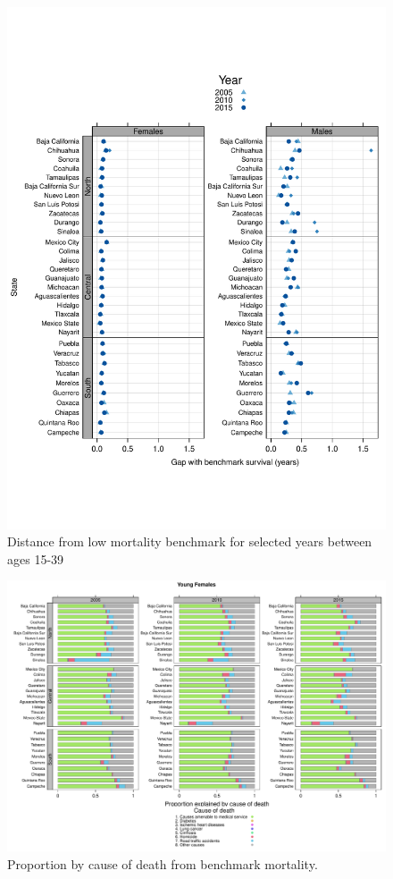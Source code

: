 \documentclass[11.5pt]{article}
\begin{document}
{\begin{figure}
\centering
\caption{Distance from low mortality benchmark for selected years between ages 15-39}
\begin{center}
\includegraphics[scale=.5]{Distance_ya.pdf}
\end{center}
\end{figure}





\begin{figure}
\centering
\caption{Proportion by cause of death from benchmark mortality.}
\begin{center}
\includegraphics[scale=.45]{Figure_prop_yf.pdf}
\end{center}
\end{figure}

}
\end{document}
